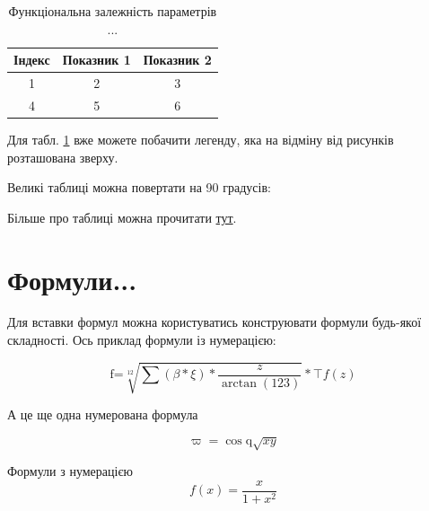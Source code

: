 \begin{table}[h]
	\caption{\label{table:2}Функціональна залежність параметрів ...}
	\begin{tabular}{|c|c|c|}
		\hline 
		Індекс & Показник 1 & Показник 2\tabularnewline
		\hline 
		\hline 
		1 & 2 & 3\tabularnewline
		\hline 
		4 & 5 & 6\tabularnewline
		\hline 
	\end{tabular}
\end{table}

Для табл. \ref{table:2} вже можете побачити легенду, яка на відміну від рисунків розташована зверху.

Великі таблиці можна повертати на 90 градусів:


Більше про таблиці можна прочитати \href{https://www.overleaf.com/learn/latex/Tables}{тут}.

\clearpage{}

\section{Формули...}
Для вставки формул можна користуватись конструювати формули будь-якої складності. Ось приклад формули із нумерацією:

\begin{equation}
	\text{f=}\sqrt[12]{\sum\left(\beta*\xi\right)*\frac{z}{\arctan(123)}}*\top f(z)
\end{equation}

А це ще одна нумерована формула

\begin{equation}
	\varpi=\cos\text{q}\sqrt{{x}{y}}
\end{equation}

Формули з нумерацією    
\begin{equation}
    f(x)=\frac{x}{1+x^2}
\end{equation}

